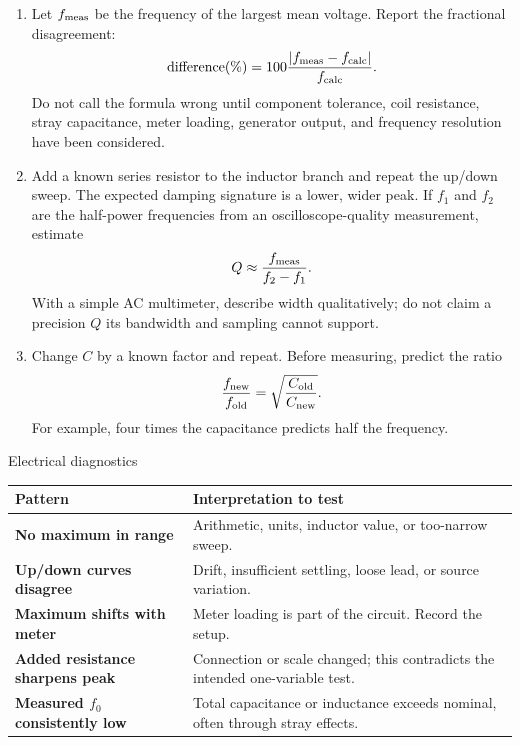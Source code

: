 \begin{enumerate}[resume]
\item Let \(f_{\rm meas}\) be the frequency of the largest mean voltage. Report
the fractional disagreement:
\[
\text{difference}(\%)=
100\frac{\left|f_{\rm meas}-f_{\rm calc}\right|}{f_{\rm calc}}.
\]
Do not call the formula wrong until component tolerance, coil resistance,
stray capacitance, meter loading, generator output, and frequency resolution
have been considered.

\item Add a known series resistor to the inductor branch and repeat the
up/down sweep. The expected damping signature is a lower, wider peak. If
\(f_1\) and \(f_2\) are the half-power frequencies from an oscilloscope-quality
measurement, estimate
\[
Q\approx\frac{f_{\rm meas}}{f_2-f_1}.
\]
With a simple AC multimeter, describe width qualitatively; do not claim a
precision \(Q\) its bandwidth and sampling cannot support.

\item Change \(C\) by a known factor and repeat. Before measuring, predict the
ratio
\[
\frac{f_{\rm new}}{f_{\rm old}}
=\sqrt{\frac{C_{\rm old}}{C_{\rm new}}}.
\]
For example, four times the capacitance predicts half the frequency.
\end{enumerate}

\begin{teloscard}{Electrical diagnostics}
\begin{tabularx}{\linewidth}{@{}>{\bfseries}p{.25\linewidth}L@{}}
\toprule
Pattern & Interpretation to test\\
\midrule
No maximum in range & Arithmetic, units, inductor value, or too-narrow sweep.\\
Up/down curves disagree & Drift, insufficient settling, loose lead, or source variation.\\
Maximum shifts with meter & Meter loading is part of the circuit. Record the setup.\\
Added resistance sharpens peak & Connection or scale changed; this contradicts the intended one-variable test.\\
Measured \(f_0\) consistently low & Total capacitance or inductance exceeds nominal, often through stray effects.\\
\bottomrule
\end{tabularx}
\end{teloscard}



